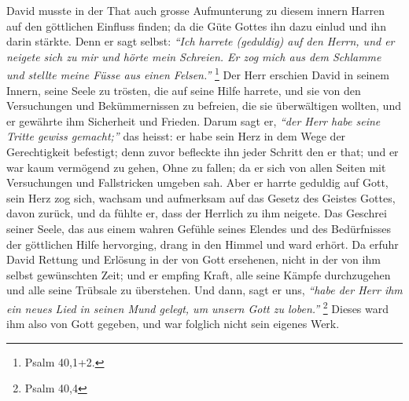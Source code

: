 David  musste in der That auch grosse Aufmunterung zu
diesem innern Harren
auf den göttlichen Einfluss finden; da die Güte Gottes ihn dazu einlud und ihn
darin stärkte. Denn er sagt selbst:
\textit{"`Ich harrete (geduldig) auf den Herrn, und
er neigete sich zu mir und hörte mein Schreien. Er zog mich aus dem Schlamme und
stellte meine Füsse aus einen Felsen."'}
\footnote{Psalm 40,1+2.}
Der Herr
erschien David in seinem Innern, seine Seele zu trösten, die auf
seine Hilfe
harrete, und sie von den Versuchungen und Bekümmernissen zu befreien, die sie
überwältigen wollten, und er gewährte ihm Sicherheit und Frieden. Darum sagt er,
\textit{"`der Herr habe seine Tritte gewiss gemacht;"'}
das heisst: er habe sein Herz in
dem Wege der Gerechtigkeit befestigt; denn zuvor befleckte ihn jeder Schritt den
er that; und er war kaum vermögend zu gehen, Ohne zu fallen; da er sich von
allen Seiten mit Versuchungen und Fallstricken umgeben sah. Aber er harrte
geduldig auf Gott, sein Herz zog sich, wachsam und aufmerksam auf das Gesetz des
Geistes Gottes, davon zurück, und da fühlte er, dass der Herrlich zu ihm
neigete. Das Geschrei seiner Seele, das aus einem
wahren Gefühle seines Elendes
und des Bedürfnisses der göttlichen Hilfe hervorging, drang in den Himmel und
ward erhört. Da erfuhr David Rettung und Erlösung in der von Gott ersehenen,
nicht in der von ihm selbst gewünschten Zeit; und er empfing Kraft, alle seine
Kämpfe durchzugehen und alle seine Trübsale zu überstehen. Und dann, sagt er
uns,
\textit{"`habe der Herr ihm ein neues Lied in seinen Mund gelegt, um unsern Gott
zu
loben."'}
\footnote{Psalm 40,4}
Dieses ward ihm also von Gott gegeben, und war
folglich nicht sein eigenes Werk.

\medskip

